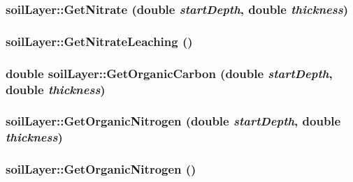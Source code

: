 \hypertarget{classsoil_layer_a35ebeffcc6514687cac1cb50dea2cad1}{
\subsubsection[{GetNitrate}]{ soilLayer::GetNitrate (double {\em startDepth}, \/  double {\em thickness})}}
\label{classsoil_layer_a35ebeffcc6514687cac1cb50dea2cad1}
\hypertarget{classsoil_layer_aa65c1b73e58aa539a36d46d3733ce1b8}{
\subsubsection[{GetNitrateLeaching}]{ soilLayer::GetNitrateLeaching ()}}
\label{classsoil_layer_aa65c1b73e58aa539a36d46d3733ce1b8}
\hypertarget{classsoil_layer_a5ee886837c6c59aa88ff44633bbd5c4b}{
\subsubsection[{GetOrganicCarbon}]{\setlength{\rightskip}{0pt plus 5cm}double soilLayer::GetOrganicCarbon (double {\em startDepth}, \/  double {\em thickness})}}
\label{classsoil_layer_a5ee886837c6c59aa88ff44633bbd5c4b}
\hypertarget{classsoil_layer_a0ced82f9d04aa117b289acd4daa61659}{
\subsubsection[{GetOrganicNitrogen}]{ soilLayer::GetOrganicNitrogen (double {\em startDepth}, \/  double {\em thickness})}}
\label{classsoil_layer_a0ced82f9d04aa117b289acd4daa61659}
\hypertarget{classsoil_layer_ab59162a095c3cc12c515b5e37f3b650a}{
\subsubsection[{GetOrganicNitrogen}]{ soilLayer::GetOrganicNitrogen ()}}
